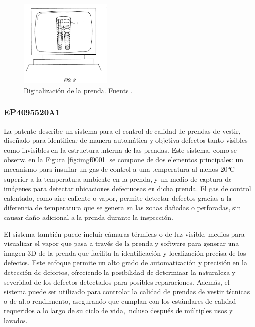 \begin{figure}[H]
	\centering
	\includegraphics[width=0.4\textwidth]{img/US5530652-drawings-page-5.png}
	\caption[Digitalización de la prenda.]{Digitalización de la prenda. Fuente \cite{US5530652A}.}
	\label{fig:US5530652-5}
\end{figure}

\subsubsection{EP4095520A1}

La patente \cite{EP4095520A1} describe un sistema para el control de calidad de prendas de vestir, diseñado para identificar de manera automática y objetiva defectos tanto visibles como invisibles en la estructura interna de las prendas. Este sistema, como se observa en la Figura \ref{fig:imgf0001} se compone de dos elementos principales: un mecanismo para insuflar un gas de control a una temperatura al menos 20°C superior a la temperatura ambiente en la prenda, y un medio de captura de imágenes para detectar ubicaciones defectuosas en dicha prenda. El gas de control calentado, como aire caliente o vapor, permite detectar defectos gracias a la diferencia de temperatura que se genera en las zonas dañadas o perforadas, sin causar daño adicional a la prenda durante la inspección.

El sistema también puede incluir cámaras térmicas o de luz visible, medios para visualizar el vapor que pasa a través de la prenda y software para generar una imagen 3D de la prenda que facilita la identificación y localización precisa de los defectos. Este enfoque permite un alto grado de automatización y precisión en la detección de defectos, ofreciendo la posibilidad de determinar la naturaleza y severidad de los defectos detectados para posibles reparaciones. Además, el sistema puede ser utilizado para controlar la calidad de prendas de vestir técnicas o de alto rendimiento, asegurando que cumplan con los estándares de calidad requeridos a lo largo de su ciclo de vida, incluso después de múltiples usos y lavados.

